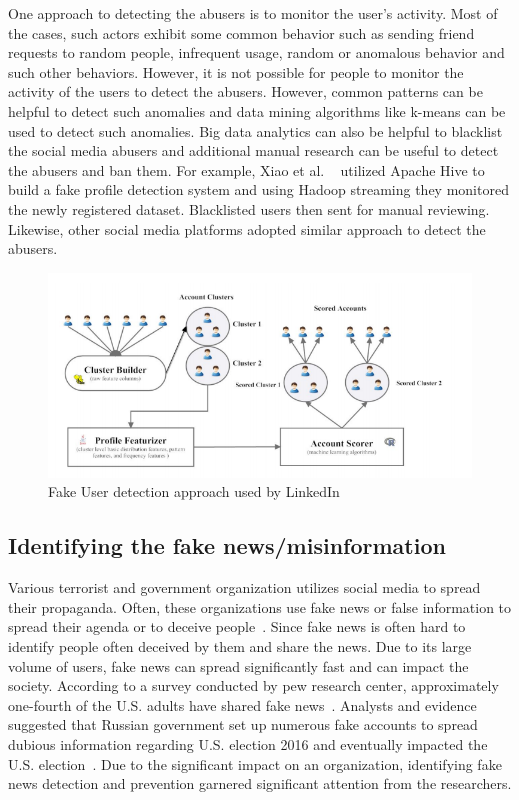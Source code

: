 \documentclass[sigconf]{acmart}
\begin{document}
One approach to detecting the abusers is to monitor the user's activity. Most of the cases, such actors exhibit some common behavior such as sending friend requests to random people, infrequent usage, random or anomalous behavior and such other behaviors. However, it is not possible for people to monitor the activity of the users to detect the abusers. However, common patterns can be helpful to detect such anomalies and data mining algorithms like k-means can be used to detect such anomalies. Big data analytics can also be helpful to blacklist the social media abusers and additional manual research can be useful to detect the abusers and ban them. For example, Xiao et al. ~\cite{Xiao:2015:DCF:2808769.2808779} utilized Apache Hive to build a fake profile detection system and using Hadoop streaming they monitored the newly registered dataset. Blacklisted users then sent for manual reviewing. Likewise, other social media platforms adopted similar approach to detect the abusers. 

\begin{figure}[!ht]
 \centering\includegraphics[width=\columnwidth]{images/fakeuser.png}
  \caption{Fake User detection approach used by LinkedIn\cite{Xiao:2015:DCF:2808769.2808779}}
  \label{f:fake}
\end{figure}


\subsection{Identifying the fake news/misinformation }
Various terrorist and government organization utilizes social media to spread their propaganda. Often, these organizations use fake news or false information to spread their agenda or to deceive people~\cite{Aymanns:2017}.  Since fake news is often hard to identify people often deceived by them and share the news. Due to its large volume of users, fake news can spread significantly fast and can impact the society. According to a survey conducted by pew research center, approximately one-fourth of the U.S. adults have shared fake news~\cite{fake2}. Analysts and evidence suggested that Russian government set up numerous fake accounts to spread dubious information regarding U.S. election 2016 and eventually impacted the U.S. election~\cite{fake2, Allcott:2017}.  Due to the significant impact on an organization, identifying fake news detection and prevention garnered significant attention from the researchers.
\end{document}
